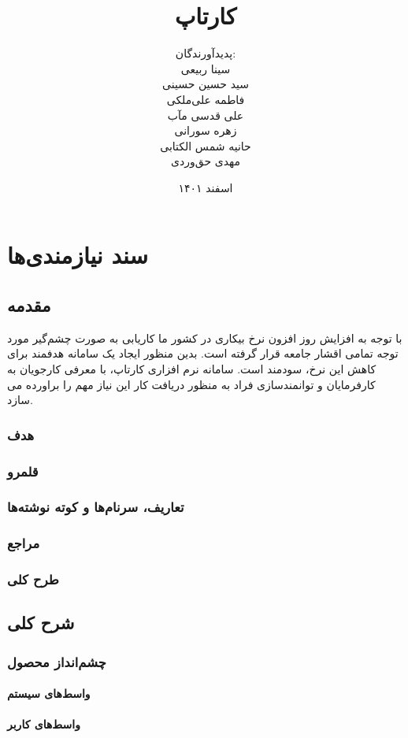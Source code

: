 \documentclass{report}
\title{
	{\Huge کارتاپ}
}
\author{
	پدید‌آورندگان: \\
	سینا ربیعی \\
	سید حسین حسینی \\
	فاطمه علی‌ملکی \\
	علی قدسی مآب \\
	زهره سورانی \\
	حانیه شمس الکتابی \\
	مهدی حق‌وردی
}
\date{اسفند ۱۴۰۱}
\begin{document}
	\maketitle
	\tableofcontents
	
	\chapter{سند نیازمندی‌ها}
		\section{مقدمه} 
			با توجه به افزایش روز افزون نرخ بیکاری در کشور ما کاریابی به صورت چشم‌گیر مورد توجه تمامی اقشار جامعه قرار گرفته است. بدین منظور ایجاد یک سامانه هدفمند برای کاهش این نرخ، سودمند است. سامانه نرم افزاری کارتاپ، با معرفی کارجویان به کارفرمایان و توانمندسازی فراد به منظور دریافت کار این نیاز مهم را براورده می سازد.
			\subsection{هدف}
			\subsection{قلمرو} 
			\subsection{تعاریف، سرنام‌ها و کوته نوشته‌ها}
			\subsection{مراجع}
			\subsection{طرح کلی}
		\section{شرح کلی}
			\subsection{چشم‌انداز محصول}
				\subsubsection{واسط‌های سیستم}
				\subsubsection{واسط‌های کاربر}
\end{document}
